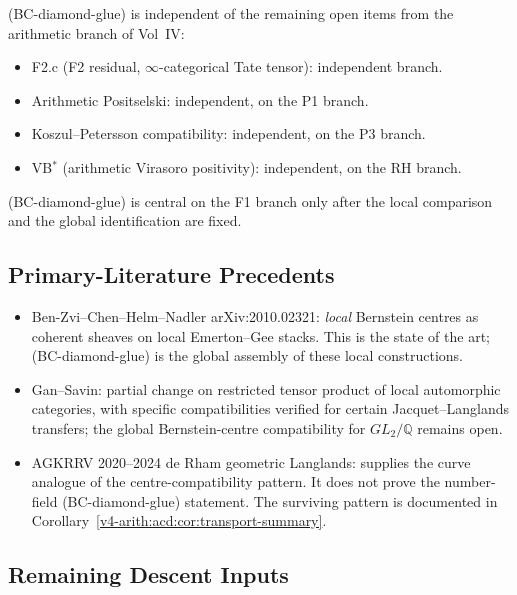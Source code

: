 (BC-diamond-glue) is independent of the remaining open items from
the arithmetic branch of Vol~IV:
\begin{itemize}
\item F2.c (F2 residual, \(\infty\)-categorical Tate tensor): independent branch.
\item Arithmetic Positselski: independent, on the P1 branch.
\item Koszul--Petersson compatibility: independent, on the P3 branch.
\item VB\(^{*}\) (arithmetic Virasoro positivity): independent, on the
RH branch.
\end{itemize}

(BC-diamond-glue) is central on the F1 branch only after the local
comparison and the global identification are fixed.

\subsection{Primary-Literature Precedents}

\begin{itemize}
\item Ben-Zvi--Chen--Helm--Nadler arXiv:2010.02321: \emph{local}
Bernstein centres as coherent sheaves on local Emerton--Gee stacks.
This is the state of the art; (BC-diamond-glue) is the global
assembly of these local constructions.
\item Gan--Savin: partial change on restricted
tensor product of local automorphic categories, with specific
compatibilities verified for certain Jacquet--Langlands transfers;
the global Bernstein-centre compatibility for \(GL_{2}/\mathbb{Q}\)
remains open.
\item AGKRRV 2020--2024 de Rham geometric Langlands: supplies the
curve analogue of the centre-compatibility pattern.  It does not prove
the number-field (BC-diamond-glue) statement. The surviving pattern is
documented in
Corollary~\ref{v4-arith:acd:cor:transport-summary}.
\end{itemize}

\subsection{Remaining Descent Inputs}

